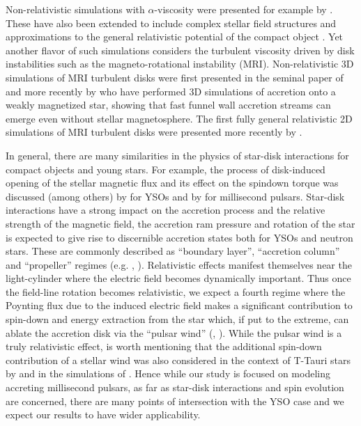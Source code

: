 \documentclass[fleqn,usenatbib]{mnras}
\begin{document}
Non-relativistic simulations with $\alpha$-viscosity were presented for example by \cite{Romanova2002,Bessolaz2008,Fendt2009conf,Zanni2009,Zanni2013,RomanovaKoldobaEtAl2021}.  These have also been extended to include complex stellar field structures \citep{Long2007,Long2008} and approximations to the general relativistic potential of the compact object \citep{Kulkarni2005}.  
Yet another flavor of such simulations considers the turbulent viscosity driven by disk instabilities such as the magneto-rotational instability (MRI).  Non-relativistic 3D simulations of MRI turbulent disks were first presented in the seminal paper of \cite{Romanova2012} and more recently by  \citep{TakasaoTomidaEtAl2018} who have performed 3D simulations of accretion onto a weakly magnetized star, showing that fast funnel wall accretion streams can emerge even without stellar magnetosphere.  The first fully general relativistic 2D simulations of MRI turbulent disks were presented more recently by \citet[][hereafter PT17]{Parfrey2017}. %

In general, there are many similarities in the physics of star-disk interactions for compact objects and young stars.  For example, the process of disk-induced opening of the stellar magnetic flux and its effect on the spindown torque was discussed (among others) by \cite{Ferreira2000,MattPudritz2005a} for YSOs and by \cite{Parfrey2016} for millisecond pulsars.  Star-disk interactions have a strong impact on the accretion process and the relative strength of the magnetic field, the accretion ram pressure and rotation of the star is expected to give rise to discernible accretion states both for YSOs and neutron stars.  These are commonly described as ``boundary layer'', ``accretion column'' and ``propeller'' regimes (e.g. \cite{MattPudritz2005}, ).  
Relativistic effects manifest themselves near the light-cylinder where the electric field becomes dynamically important.  Thus once the field-line rotation becomes relativistic, we expect a fourth regime where the Poynting flux due to the induced electric field makes a significant contribution to spin-down and energy extraction from the star which, if put to the extreme, can ablate the accretion disk via the ``pulsar wind'' (\cite{Parfrey2016}, ).  While the pulsar wind is a truly relativistic effect, is worth mentioning that the additional spin-down contribution of a stellar wind was also considered in the context of T-Tauri stars by \cite{MattPudritz2005} and in the simulations of \cite{Zanni2009}. Hence while our study is focused on modeling accreting millisecond pulsars, as far as star-disk interactions and spin evolution are concerned, there are many points of intersection with the YSO case and we expect our results to have wider applicability.  
\end{document}
